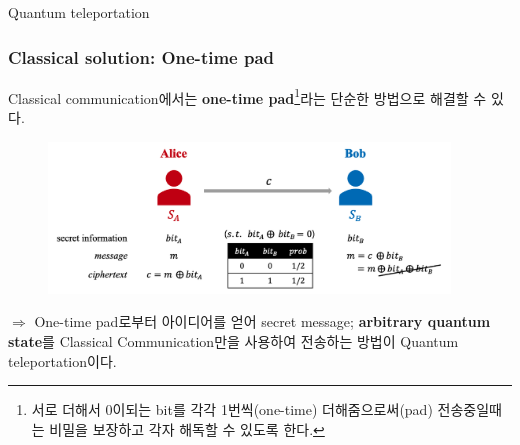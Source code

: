 \documentclass[9pt]{beamer}
\begin{document}
\begin{section}{Quantum teleportation}
        \begin{frame}
            \frametitle{Classical solution: One-time pad}
            Classical communication에서는 \textbf{one-time pad}\footnote{서로 더해서 0이되는 bit를 각각 1번씩(one-time) 더해줌으로써(pad) 전송중일때는 비밀을 보장하고 각자 해독할 수 있도록 한다.}라는 단순한 방법으로 해결할 수 있다. 
            \begin{figure}
                \centering
                \includegraphics[width=0.95\textwidth]{image/L5_classical.png}
            \end{figure}
            \vspace{0.2cm}
            $\Rightarrow$ One-time pad로부터 아이디어를 얻어 secret message; \textbf{arbitrary quantum state}를 \alert{Classical Communication}만을 사용하여 전송하는 방법이 Quantum teleportation이다.
        \end{frame}



\end{section}
\end{document}
